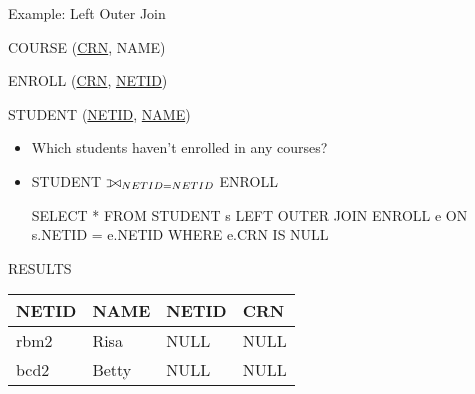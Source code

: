 \documentclass[aspectratio=169]{beamer}
\def\ojoin{\setbox0=\hbox{$\bowtie$}%
  \rule[-.02ex]{.25em}{.4pt}\llap{\rule[\ht0]{.25em}{.4pt}}}
\def\leftouterjoin{\mathbin{\ojoin\mkern-5.8mu\bowtie}}
\begin{document}
\begin{frame}[fragile]{Example: Left Outer Join}

COURSE (\underline{CRN}, NAME)

ENROLL (\underline{CRN}, \underline{NETID})

STUDENT (\underline{NETID}, \underline{NAME})


\begin{itemize}
\item Which students haven't enrolled in any courses?
\item STUDENT $\leftouterjoin_{NETID = NETID}$ ENROLL

\begin{SQL}
SELECT *
FROM STUDENT s LEFT OUTER JOIN ENROLL e ON s.NETID = e.NETID
WHERE e.CRN IS NULL
\end{SQL}
\end{itemize}

RESULTS\\
\begin{tabular}{|l|l|l|l|} \hline
\textbf{NETID} & \textbf{NAME} & \textbf{NETID} & \textbf{CRN} \\ \hline
rbm2 & Risa & NULL & NULL\\\hline
bcd2 & Betty & NULL & NULL \\ \hline
\end{tabular}\\


\end{frame}
\end{document}

